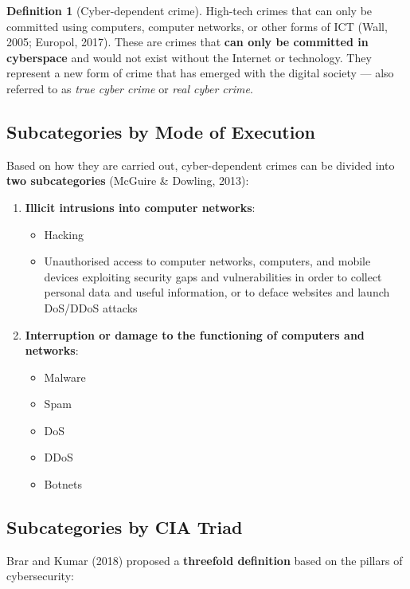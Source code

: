 \documentclass[11pt,a4paper,openany]{report}
\theoremstyle{definition}
\newtheorem{definition}{Definition}[chapter]
\theoremstyle{plain}
\theoremstyle{remark}
\begin{document}
\begin{definition}[Cyber-dependent crime]
High-tech crimes that can only be committed using computers, computer networks, or other forms of ICT (Wall, 2005; Europol, 2017). These are crimes that \textbf{can only be committed in cyberspace} and would not exist without the Internet or technology. They represent a new form of crime that has emerged with the digital society --- also referred to as \textit{true cyber crime} or \textit{real cyber crime}.
\end{definition}

\subsection{Subcategories by Mode of Execution}

Based on how they are carried out, cyber-dependent crimes can be divided into \textbf{two subcategories} (McGuire \& Dowling, 2013):

\begin{enumerate}
    \item \textbf{Illicit intrusions into computer networks}:
    \begin{itemize}
        \item Hacking
        \item Unauthorised access to computer networks, computers, and mobile devices exploiting security gaps and vulnerabilities in order to collect personal data and useful information, or to deface websites and launch DoS/DDoS attacks
    \end{itemize}
    \item \textbf{Interruption or damage to the functioning of computers and networks}:
    \begin{itemize}
        \item Malware
        \item Spam
        \item DoS
        \item DDoS
        \item Botnets
    \end{itemize}
\end{enumerate}

\subsection{Subcategories by CIA Triad}

Brar and Kumar (2018) proposed a \textbf{threefold definition} based on the pillars of cybersecurity:
\end{document}
